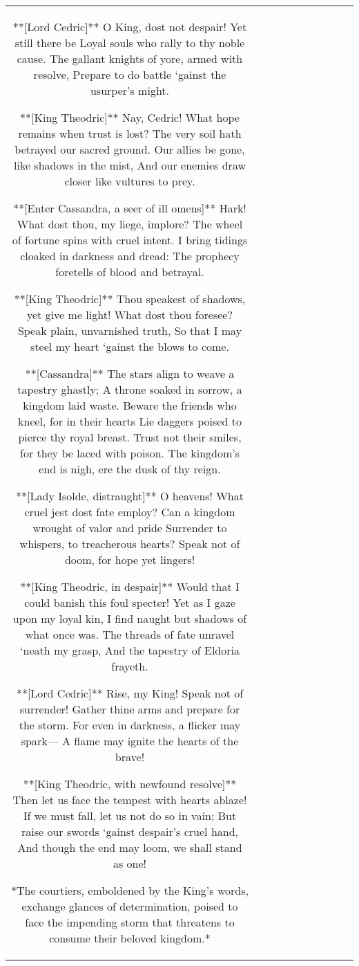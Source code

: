 \begin{table}[h!]
\begin{tabular}{|c|c|c|c|c|c|c|c|c|c|}
**[Lord Cedric]**  
O King, dost not despair! Yet still there be  
Loyal souls who rally to thy noble cause.  
The gallant knights of yore, armed with resolve,  
Prepare to do battle ‘gainst the usurper’s might.

**[King Theodric]**  
Nay, Cedric! What hope remains when trust is lost?  
The very soil hath betrayed our sacred ground.  
Our allies be gone, like shadows in the mist,  
And our enemies draw closer like vultures to prey.

**[Enter Cassandra, a seer of ill omens]**  
Hark! What dost thou, my liege, implore?  
The wheel of fortune spins with cruel intent.  
I bring tidings cloaked in darkness and dread:  
The prophecy foretells of blood and betrayal.

**[King Theodric]**  
Thou speakest of shadows, yet give me light!  
What dost thou foresee? Speak plain, unvarnished truth,  
So that I may steel my heart ‘gainst the blows to come.

**[Cassandra]**  
The stars align to weave a tapestry ghastly;  
A throne soaked in sorrow, a kingdom laid waste.  
Beware the friends who kneel, for in their hearts  
Lie daggers poised to pierce thy royal breast.  
Trust not their smiles, for they be laced with poison.  
The kingdom’s end is nigh, ere the dusk of thy reign.

**[Lady Isolde, distraught]**  
O heavens! What cruel jest dost fate employ?  
Can a kingdom wrought of valor and pride  
Surrender to whispers, to treacherous hearts?  
Speak not of doom, for hope yet lingers!

**[King Theodric, in despair]**  
Would that I could banish this foul specter!  
Yet as I gaze upon my loyal kin,  
I find naught but shadows of what once was.  
The threads of fate unravel ‘neath my grasp,  
And the tapestry of Eldoria frayeth.

**[Lord Cedric]**  
Rise, my King! Speak not of surrender!  
Gather thine arms and prepare for the storm.  
For even in darkness, a flicker may spark—  
A flame may ignite the hearts of the brave!

**[King Theodric, with newfound resolve]**  
Then let us face the tempest with hearts ablaze!  
If we must fall, let us not do so in vain;  
But raise our swords ‘gainst despair’s cruel hand,  
And though the end may loom, we shall stand as one! 

*The courtiers, emboldened by the King’s words, exchange glances of determination, poised to face the impending storm that threatens to consume their beloved kingdom.*


\end{tabular}
\end{table}
